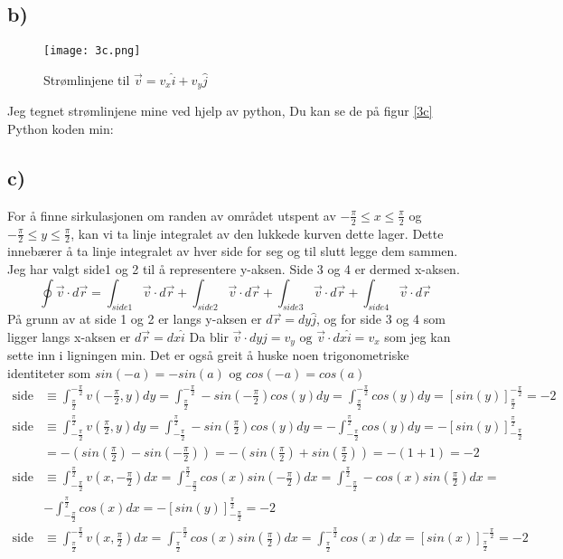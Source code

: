 \documentclass[a4paper,12pt,norsk]{article}
\begin{document}
\subsection{b)}
\begin{figure}[h!]
\texttt{[image: 3c.png]} 
\caption{Strømlinjene til $\vec{v} = v_x\hat{i} + v_y\hat{j}$}
\label{3c}
\end{figure}
Jeg tegnet strømlinjene mine ved hjelp av python, Du kan se de på figur \vref{3c}\\
Python koden min:


\subsection{c)}
For å finne sirkulasjonen om randen av området utspent av $-\frac{\pi}{2} \leq x \leq \frac{\pi}{2}$ og $-\frac{\pi}{2} \leq y \leq \frac{\pi}{2}$, kan vi ta linje integralet av den lukkede kurven dette lager. Dette innebærer å ta linje integralet av hver side for seg og til slutt legge dem sammen. Jeg har valgt side1 og 2 til å representere y-aksen. Side 3 og 4 er dermed x-aksen.
$$\oint \vec{v} \cdot d\vec{r} = \int_{side1} \vec{v} \cdot d\vec{r} + \int_{side2} \vec{v} \cdot d\vec{r} + \int_{side3} \vec{v} \cdot d\vec{r} + \int_{side4} \vec{v} \cdot d\vec{r}$$
På grunn av at side 1 og 2 er langs y-aksen er $d\vec{r} = dy\hat{j}$, og for side 3 og 4 som ligger langs x-aksen er $d\vec{r} = dx\hat{i}$ Da blir $\vec{v} \cdot dy\hat{j} = v_y \textrm{ og } \vec{v} \cdot dx\hat{i} = v_x$ som jeg kan sette inn i ligningen min. Det er også greit å huske noen trigonometriske identiteter som $sin(-a) = -sin(a) \textrm{ og } cos(-a) = cos(a)$
\begin{align*}
\text{side 1.} &\equiv  \int_{\frac{\pi}{2}}^{-\frac{\pi}{2}} v(-\frac{\pi}{2},y) dy = \int_{\frac{\pi}{2}}^{-\frac{\pi}{2}} -sin(-\frac{\pi}{2})cos(y)dy = \int_{\frac{\pi}{2}}^{-\frac{\pi}{2}} cos(y)dy = [sin(y)]_{\frac{\pi}{2}}^{-\frac{\pi}{2}} = -2\\
\text{side 2.} &\equiv  \int_{-\frac{\pi}{2}}^{\frac{\pi}{2}} v(\frac{\pi}{2},y) dy = \int_{-\frac{\pi}{2}}^{\frac{\pi}{2}} -sin(\frac{\pi}{2})cos(y)dy = -\int_{-\frac{\pi}{2}}^{\frac{\pi}{2}}cos(y)dy = -[sin(y)]_{-\frac{\pi}{2}}^{\frac{\pi}{2}} \\ &= -(sin(\frac{\pi}{2}) - sin(-\frac{\pi}{2})) = - (sin(\frac{\pi}{2}) + sin(\frac{\pi}{2})) = -(1+1) = -2\\
\text{side 3.} &\equiv  \int_{-\frac{\pi}{2}}^{\frac{\pi}{2}} v(x,-\frac{\pi}{2}) dx = \int_{-\frac{\pi}{2}}^{\frac{\pi}{2}} cos(x)sin(-\frac{\pi}{2})dx =  \int_{-\frac{\pi}{2}}^{\frac{\pi}{2}} -cos(x)sin(\frac{\pi}{2})dx = \\
&- \int_{-\frac{\pi}{2}}^{\frac{\pi}{2}} cos(x)dx = -[sin(y)]_{-\frac{\pi}{2}}^{\frac{\pi}{2}} = -2\\
\text{side 4.} &\equiv  \int_{\frac{\pi}{2}}^{-\frac{\pi}{2}} v(x,\frac{\pi}{2}) dx = \int_{\frac{\pi}{2}}^{-\frac{\pi}{2}} cos(x)sin(\frac{\pi}{2})dx = \int_{\frac{\pi}{2}}^{-\frac{\pi}{2}} cos(x)dx = [sin(x)]_{\frac{\pi}{2}}^{-\frac{\pi}{2}} = -2\\
\end{align*}
\end{document}
